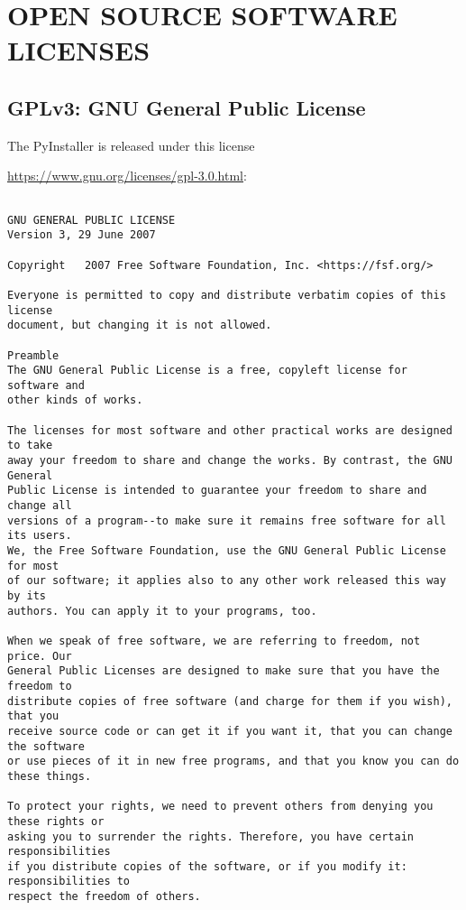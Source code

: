 \chapter{OPEN SOURCE SOFTWARE LICENSES}
\label{app:licenses}

\section{GPLv3: GNU General Public License}

The PyInstaller is released under this license

\url{https://www.gnu.org/licenses/gpl-3.0.html}:

\scriptsize
\begin{verbatim}

GNU GENERAL PUBLIC LICENSE
Version 3, 29 June 2007

Copyright   2007 Free Software Foundation, Inc. <https://fsf.org/>

Everyone is permitted to copy and distribute verbatim copies of this license
document, but changing it is not allowed.

Preamble
The GNU General Public License is a free, copyleft license for software and
other kinds of works.

The licenses for most software and other practical works are designed to take
away your freedom to share and change the works. By contrast, the GNU General
Public License is intended to guarantee your freedom to share and change all
versions of a program--to make sure it remains free software for all its users.
We, the Free Software Foundation, use the GNU General Public License for most
of our software; it applies also to any other work released this way by its
authors. You can apply it to your programs, too.

When we speak of free software, we are referring to freedom, not price. Our
General Public Licenses are designed to make sure that you have the freedom to
distribute copies of free software (and charge for them if you wish), that you
receive source code or can get it if you want it, that you can change the software
or use pieces of it in new free programs, and that you know you can do these things.

To protect your rights, we need to prevent others from denying you these rights or
asking you to surrender the rights. Therefore, you have certain responsibilities
if you distribute copies of the software, or if you modify it: responsibilities to
respect the freedom of others.


\end{verbatim}
